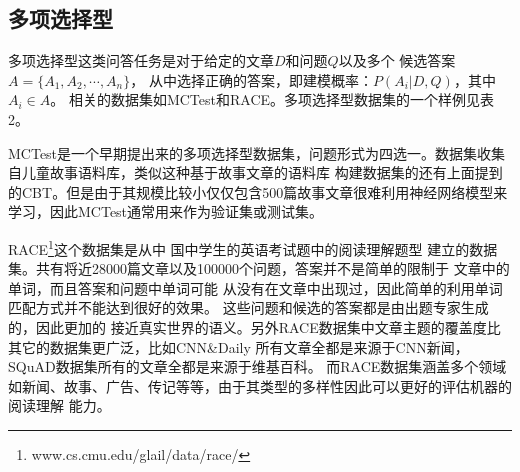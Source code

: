 \subsection{多项选择型}
多项选择型这类问答任务是对于给定的文章$D$和问题$Q$以及多个
候选答案$A=\{A_1,A_2,\cdots,A_n\}$，
从中选择正确的答案，即建模概率：$P(A_i|D,Q)$，其中$A_i \in A$。
相关的数据集如MCTest和RACE。多项选择型数据集的一个样例见表2。

MCTest是一个早期提出来的多项选择型数据集，问题形式为四选一。数据集收集自儿童故事语料库，类似这种基于故事文章的语料库
构建数据集的还有上面提到的CBT。但是由于其规模比较小仅仅包含500篇故事文章很难利用神经网络模型来学习，因此MCTest通常用来作为验证集或测试集。

RACE\footnote{www.cs.cmu.edu/glail/data/race/\label{race}}这个数据集是从中
国中学生的英语考试题中的阅读理解题型
建立的数据集。共有将近28000篇文章以及100000个问题，答案并不是简单的限制于
文章中的单词，而且答案和问题中单词可能
从没有在文章中出现过，因此简单的利用单词匹配方式并不能达到很好的效果。
这些问题和候选的答案都是由出题专家生成的，因此更加的
接近真实世界的语义。另外RACE数据集中文章主题的覆盖度比其它的数据集更广泛，比如CNN\&Daily
所有文章全都是来源于CNN新闻，SQuAD数据集所有的文章全都是来源于维基百科。
而RACE数据集涵盖多个领域如新闻、故事、广告、传记等等，由于其类型的多样性因此可以更好的评估机器的阅读理解
能力。



